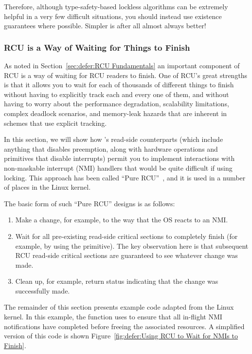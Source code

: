 Therefore, although type-safety-based lockless algorithms can be extremely
helpful in a very few difficult situations, you should instead use existence
guarantees where possible.
Simpler is after all almost always better!

\subsubsection{RCU is a Way of Waiting for Things to Finish}
\label{sec:defer:RCU is a Way of Waiting for Things to Finish}

As noted in Section~\ref{sec:defer:RCU Fundamentals}
an important component
of RCU is a way of waiting for RCU readers to finish.
One of
RCU's great strengths is that it allows you to wait for each of
thousands of different things to finish without having to explicitly
track each and every one of them, and without having to worry about
the performance degradation, scalability limitations, complex deadlock
scenarios, and memory-leak hazards that are inherent in schemes that
use explicit tracking.

In this section, we will show how 's
read-side counterparts (which include anything that disables preemption,
along with hardware operations and
primitives that disable interrupts) permit you to implement interactions with
non-maskable interrupt
(NMI) handlers that would be quite difficult if using locking.
This approach has been called ``Pure RCU''~\cite{PaulEdwardMcKenneyPhD},
and it is used in a number of places in the Linux kernel.

The basic form of such ``Pure RCU'' designs is as follows:

\begin{enumerate}
\item	Make a change, for example, to the way that the OS reacts to an NMI.
\item	Wait for all pre-existing read-side critical sections to
	completely finish (for example, by using the
	 primitive).
	The key observation here is that subsequent RCU read-side critical
	sections are guaranteed to see whatever change was made.
\item	Clean up, for example, return status indicating that the
	change was successfully made.
\end{enumerate}

The remainder of this section presents example code adapted from
the Linux kernel.
In this example, the  function uses
 to ensure that all in-flight NMI
notifications have completed before freeing the associated resources.
A simplified version of this code is shown
Figure~\ref{fig:defer:Using RCU to Wait for NMIs to Finish}.

